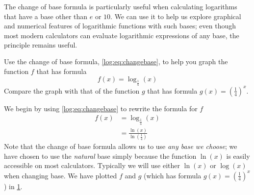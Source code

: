 The change of base formula is particularly useful when calculating logarithms
that have a base other than $e$ or $10$. We can use it to help us explore 
graphical and numerical features of logarithmic functions with such bases; 
even though most modern calculators can evaluate logarithmic expressions of 
any base, the principle remains useful.
\begin{pccexample}
	Use the change of base formula, \cref{log:eq:changebase}, to help you 
	graph the function $f$ that has formula
	\[
		f(x)=\log_{\frac{1}{4}}(x)
	\]
	Compare the graph with that of the function $g$ that has formula $g(x)=\left( \frac{1}{4} \right)^x$.
	\begin{pccsolution}
		We begin by using \cref{log:eq:changebase} to rewrite the formula for $f$
		\begin{align*}
			f(x) & =\log_{\frac{1}{4}}(x)                        \\
			     & =\frac{\ln(x)}{\ln\left( \frac{1}{4} \right)} 
		\end{align*}
		Note that the change of base formula allows us to use \emph{any base we choose}; we have
		chosen to use the \emph{natural} base simply because the function $\ln(x)$ 
		is easily accessible on most calculators. Typically we will use either $\ln(x)$
		or $\log(x)$ when changing base. We have plotted $f$ and $g$ (which has formula
		$g(x)=\left( \frac{1}{4} \right)^x$) in \cref{log:fig:quarterand4}.
		
		\begin{figure}[!htb]
			\centering
			\caption{}
			\label{log:fig:quarterand4}
		\end{figure}
		

\end{pccsolution}
\end{pccexample}

